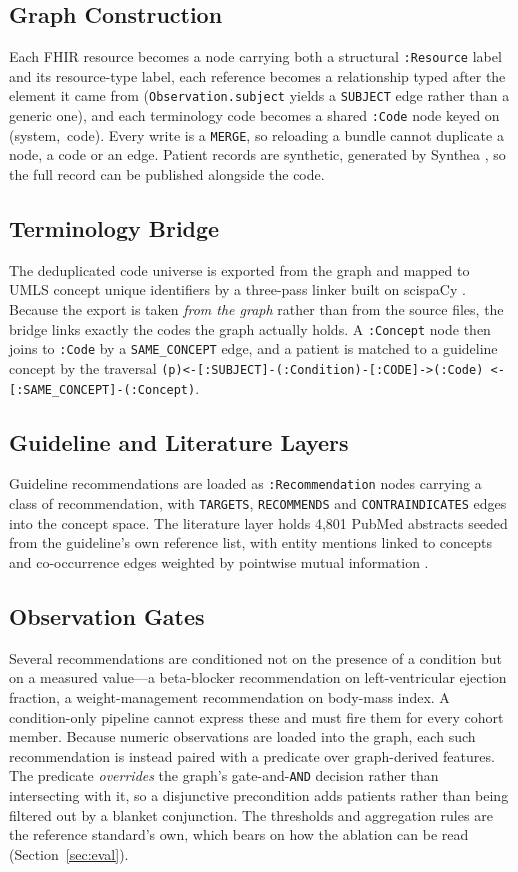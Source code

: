 \documentclass[conference]{IEEEtran}
\begin{document}
\subsection{Graph Construction}
Each FHIR resource becomes a node carrying both a structural \texttt{:Resource} label and
its resource-type label, each reference becomes a relationship typed after the element it
came from (\texttt{Observation.subject} yields a \texttt{SUBJECT} edge rather than a
generic one), and each terminology code becomes a shared \texttt{:Code} node keyed on
(system,~code). Every write is a \texttt{MERGE}, so reloading a bundle cannot duplicate a
node, a code or an edge. Patient records are synthetic, generated by Synthea
\cite{synthea,walonoski2017}, so the full record can be published alongside the code.

\subsection{Terminology Bridge}
The deduplicated code universe is exported from the graph and mapped to UMLS concept
unique identifiers by a three-pass linker built on scispaCy \cite{scispacy}. Because the
export is taken \emph{from the graph} rather than from the source files, the bridge links
exactly the codes the graph actually holds. A \texttt{:Concept} node then joins to
\texttt{:Code} by a \texttt{SAME\_CONCEPT} edge, and a patient is matched to a guideline
concept by the traversal \texttt{(p)<-[:SUBJECT]-(:Condition)-[:CODE]->(:Code)
<-[:SAME\_CONCEPT]-(:Concept)}.

\subsection{Guideline and Literature Layers}
Guideline recommendations are loaded as \texttt{:Recommendation} nodes carrying a class of
recommendation, with \texttt{TARGETS}, \texttt{RECOMMENDS} and \texttt{CONTRAINDICATES}
edges into the concept space. The literature layer holds 4,801 PubMed abstracts seeded from
the guideline's own reference list, with entity mentions linked to concepts and
co-occurrence edges weighted by pointwise mutual information \cite{pmi}.

\subsection{Observation Gates}
Several recommendations are conditioned not on the presence of a condition but on a
measured value---a beta-blocker recommendation on left-ventricular ejection fraction, a
weight-management recommendation on body-mass index. A condition-only pipeline cannot
express these and must fire them for every cohort member. Because numeric observations are
loaded into the graph, each such recommendation is instead paired with a predicate over
graph-derived features. The predicate \emph{overrides} the graph's gate-and-\texttt{AND}
decision rather than intersecting with it, so a disjunctive precondition adds patients
rather than being filtered out by a blanket conjunction. The thresholds and aggregation
rules are the reference standard's own, which bears on how the ablation can be read
(Section~\ref{sec:eval}).
\end{document}
